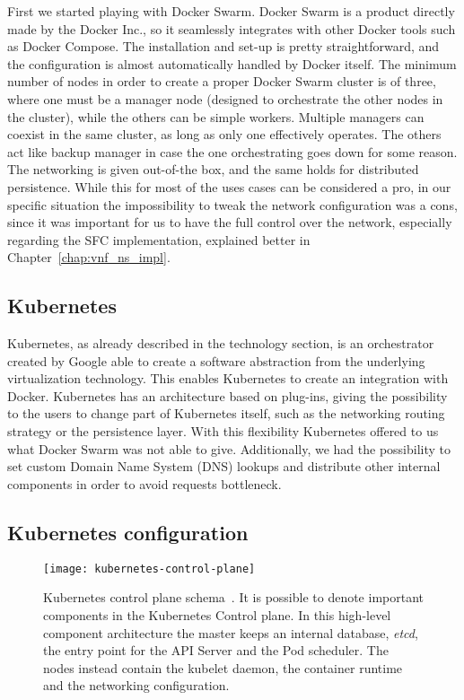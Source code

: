 First we started playing with Docker Swarm. Docker Swarm is a product directly
made by the Docker Inc., so it seamlessly integrates with other Docker tools
such as Docker Compose. The installation and set-up is pretty straightforward,
and the configuration is almost automatically handled by Docker itself. The
minimum number of nodes in order to create a proper Docker Swarm cluster is of
three, where one must be a manager node (designed to orchestrate the other
nodes in the cluster), while the others can be simple workers. Multiple managers
can coexist in the same cluster, as long as only one effectively operates. The
others act like backup manager in case the one orchestrating goes down for some
reason. The networking is given out-of-the box, and the same holds for
distributed persistence. While this for most of the uses cases can be considered
a pro, in our specific situation the impossibility to tweak the network
configuration was a cons, since it was important for us to have the full control
over the network, especially regarding the SFC implementation, explained better
in Chapter~\ref{chap:vnf_ns_impl}.

\subsection{Kubernetes}
Kubernetes, as already described in the technology section, is an orchestrator
created by Google able to create a software abstraction from the underlying
virtualization technology. This enables Kubernetes to create an integration with
Docker. Kubernetes has an architecture based on plug-ins, giving the possibility
to the users to change part of Kubernetes itself, such as the networking routing
strategy or the persistence layer. With this flexibility Kubernetes offered to
us what Docker Swarm was not able to give. Additionally, we had the possibility
to set custom Domain Name System (DNS) lookups and distribute other internal
components in order to avoid requests bottleneck.

\subsection{Kubernetes configuration}
\label{chap:archimpl:sec:secondattempt:sec:k8s}
\begin{figure}[t]
  \centering
  \texttt{[image: kubernetes-control-plane]}
  \caption[Kubernetes control plane schema]{Kubernetes control plane
    schema~\cite{k8scp}. It is possible to denote important components in the
    Kubernetes Control plane. In this high-level component architecture the
    master keeps an internal database, \emph{etcd}, the entry point for the API
    Server and the Pod scheduler. The nodes instead contain the kubelet daemon,
    the container runtime and the networking configuration.}
  \label{chap:archimpl:sec:secondattempt:img:k8scp}
\end{figure}

